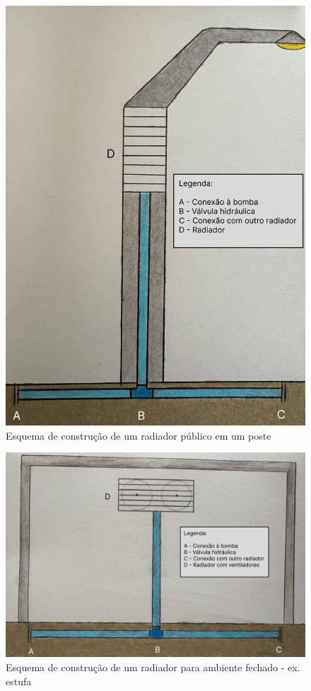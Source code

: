 \begin{figure}[ht]
    \centering
    \includegraphics[scale=0.25]{pictures/poste.png}
    \caption{Esquema de construção de um radiador público em um poste}
    \label{poste}
\end{figure}

\begin{figure}[ht]
    \centering
    \includegraphics[scale=0.25]{pictures/estufa.png}
    \caption{Esquema de construção de um radiador para ambiente fechado - ex. estufa}
    \label{estufa}
\end{figure}

